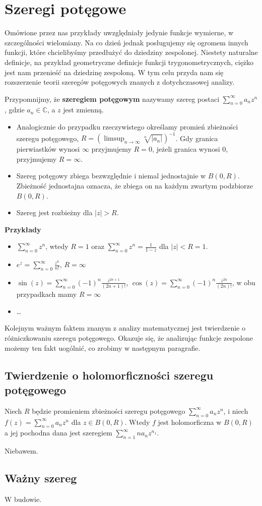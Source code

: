 \section{Szeregi potęgowe}
Omówione przez nas przykłady uwzględniały jedynie funkcje wymierne, w szczególności wielomiany. Na co dzień jednak posługujemy się ogromem innych funkcji, które chcielibyśmy przedłużyć do dziedziny zespolonej. Niestety naturalne definicje, na przykład geometryczne definicje funkcji trygonometrycznych, ciężko jest nam przenieść na dziedzinę zespoloną. W tym celu przyda nam się rozszerzenie teorii szeregów potęgowych znanych z dotychczasowej analizy. 

Przypomnijmy, że \textbf{szeregiem potęgowym} nazywamy szereg postaci $\sum_{n=0}^{\infty} a_n z^n$, gdzie $a_n \in \mathbb{C}$, a $z$ jest zmienną.
\begin{itemize}
	\item Analogicznie do przypadku rzeczywistego określamy promień zbieżności szeregu potęgowego, $R = (\limsup_{n\to\infty} \sqrt[n]{|a_n|})^{-1}$. Gdy granica pierwiastków wynosi $\infty$ przyjmujemy $R=0$, jeżeli granica wynosi $0$, przyjmujemy $R = \infty$.
	\item Szereg potęgowy zbiega bezwzględnie i niemal jednostajnie w $B(0,R)$. Zbieżność jednostajna oznacza, że zbiega on na każdym zwartym podzbiorze $B(0,R)$.
	\item Szereg jest rozbieżny dla $|z|>R$.
\end{itemize}

\textbf{Przykłady}
\begin{itemize}
	\item $\sum_{n=0}^{\infty} z^n$, wtedy $R=1$ oraz $\sum_{n=0}^{\infty} z^n = \frac{1}{1-z}$ dla $|z|<R=1$.
	\item $e^z = \sum_{n=0}^{\infty} \frac{z^n}{n!}$, $R=\infty$
	\item $\sin(z) = \sum_{n=0}^{\infty} (-1)^n \frac{z^{2n+1}}{(2n+1)!}$, $\cos(z) = \sum_{n=0}^{\infty} (-1)^n \frac{z^{2n}}{(2n)!}$, w obu przypadkach mamy $R = \infty$
	\item \dots
\end{itemize}

 Kolejnym ważnym faktem znanym z analizy matematycznej jest twierdzenie o różniczkowaniu szeregu potęgowego. Okazuje się, że analizując funkcje zespolone możemy ten fakt uogólnić, co zrobimy w następnym paragrafie.

\subsection{Twierdzenie o holomorficzności szeregu potęgowego}
Niech $R$ będzie promieniem zbieżności szeregu potęgowego $\sum_{n=0}^{\infty} a_n z^n$, i niech $f(z) = \sum_{n=0}^{\infty} a_nz^n$ dla $z \in B(0,R)$. Wtedy $f$ jest holomorficzna w $B(0,R)$ a jej pochodna dana jest szeregiem $\sum_{n=1}^{\infty} na_n z^{n_1}$.

Niebawem.

\subsection{Ważny szereg}
W budowie.
